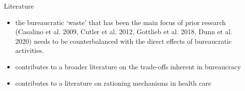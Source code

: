 \begin{frame}{Literature}
    \begin{itemize}
        \item the bureaucratic ‘waste’ that has been the main focus of prior research (Casalino et al. 2009, Cutler et al. 2012, Gottlieb et al. 2018, Dunn et al. 2020) needs to be counterbalanced with the direct effects of bureaucratic activities.
        \item contributes to a broader literature on the trade-offs inherent in bureaucracy
        \item contributes to a literature on rationing mechanisms in health care
    \end{itemize}
\end{frame}